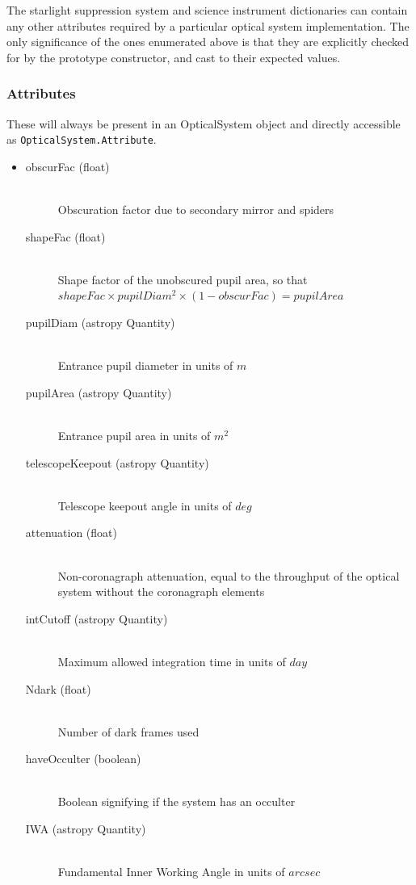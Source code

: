 \documentclass[cleanfoot]{asme2ej}
\begin{document}
The starlight suppression system and science instrument dictionaries can contain any other attributes required by a particular optical system implementation.  The only significance of the ones enumerated above is that they are explicitly checked for by the prototype constructor, and cast to their expected values.

\subsubsection*{Attributes}
These will always be present in an OpticalSystem object and directly accessible as \verb+OpticalSystem.Attribute+.
\begin{itemize}
\item 
\begin{description}
    \item[obscurFac (float)] \hfill \\ Obscuration factor due to secondary mirror and spiders
    \item[shapeFac (float)] \hfill \\ Shape factor of the unobscured pupil area, so that $ shapeFac \times pupilDiam^2  \times (1-obscurFac) = pupilArea $
    \item[pupilDiam (astropy Quantity)] \hfill \\ Entrance pupil diameter in units of $ m $
    \item[pupilArea (astropy Quantity)] \hfill \\ Entrance pupil area in units of $ m^{2} $
    \item[telescopeKeepout (astropy Quantity)] \hfill \\ Telescope keepout angle in units of $ deg $
    \item[attenuation (float)] \hfill \\ Non-coronagraph attenuation, equal to the throughput of the optical system without the coronagraph elements
    \item[intCutoff (astropy Quantity)] \hfill \\ Maximum allowed integration time in units of $ day $
    \item[Ndark (float)] \hfill \\ Number of dark frames used
    \item[haveOcculter (boolean)] \hfill \\ Boolean signifying if the system has an occulter
    \item[IWA (astropy Quantity)] \hfill \\ Fundamental Inner Working Angle in units of $ arcsec $

\end{description}
\end{itemize}
\end{document}
